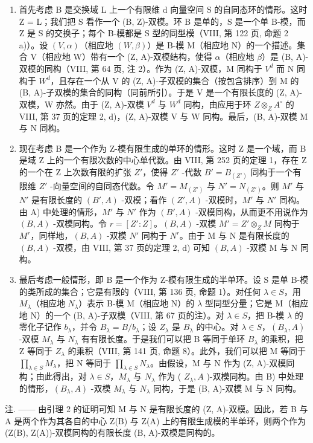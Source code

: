 \begin{enumerate}
\def\labelenumi{\Alph{enumi})}
\item
  首先考虑 B 是交换域 L 上一个有限维 d 向量空间 S 的自同态环的情形。这时 Z = L；我们把 S 看作一个 (B, Z)-双模。环 B 是单的，S 是一个单 B-模，而 Z 是 S 的交换子；每个 B-模都是 S 型的同型模（VIII, 第 122 页, 命题 2 a)）。设 \((V, \alpha)\)（相应地 \((W, \beta)\)）是 B-模 M（相应地 N）的一个描述。集合 V（相应地 W）带有一个 (Z, A)-双模结构，使得 \(\alpha\)（相应地 \(\beta\)）是 (B, A)-双模的同构（VIII, 第 64 页, 注 2）。作为 (Z, A)-双模，M 同构于 \(V^{d}\) 而 N 同构于 \(W^{d}\)，且存在一个从 V 的 (Z, A)-子双模的集合（按包含排序）到 M 的 (B, A)-子双模的集合的同构（同前所引）。于是 V 是一个有限长度的 (Z, A)-双模，W 亦然。由于 (Z, A)-双模 \(V^{d}\) 与 \(W^{d}\) 同构，由应用于环 \(Z \otimes_{Z} A^{\circ}\) 的 VIII, 第 37 页的定理 2, d)，(Z, A)-双模 V 与 W 同构。最后，(B, A)-双模 M 与 N 同构。
\item
  现在考虑 B 是一个作为 Z-模有限生成的单环的情形。这时 Z 是一个域，而 B 是域 Z 上的一个有限次数的中心单代数。由 VIII, 第 252 页的定理 1，存在 Z 的一个在 Z 上次数有限的扩张 \(Z'\)，使得 \(Z'\) -代数 \(B' = B_{(Z')}\) 同构于一个有限维 \(Z'\) -向量空间的自同态代数。令 \(M' = M_{(Z')}\) 与 \(N' = N_{(Z')}\)。则 \(M'\) 与 \(N'\) 是有限长度的 \((B', A)\) -双模；看作 \((Z', A)\) -双模时，\(M'\) 与 \(N'\) 同构。由 A) 中处理的情形，\(M'\) 与 \(N'\) 作为 \((B', A)\) -双模同构，从而更不用说作为 \((B, A)\) -双模同构。令 \(r = [Z' : Z]\)。\((B, A)\) -双模 \(M' = Z' \otimes_{Z} M\) 同构于 \(M^r\)，同样地，\((B, A)\) -双模 \(N'\) 同构于 \(N^r\)。由于 M 与 N 是有限长度的 \((B, A)\) -双模，由 VIII, 第 37 页的定理 2, d) 可知 \((B, A)\) -双模 M 与 N 同构。
\item
  最后考虑一般情形，即 B 是一个作为 Z-模有限生成的半单环。设 S 是单 B-模的类所成的集合；它是有限的（VIII, 第 136 页, 命题 1）。对任何 \(\lambda \in S\)，用 \(M_{\lambda}\)（相应地 \(N_{\lambda}\)）表示 B-模 M（相应地 N）的 \(\lambda\) 型同型分量；它是 M（相应地 N）的一个 (B, A)-子双模（VIII, 第 67 页的注）。对 \(\lambda \in S\)，把 B-模 \(\lambda\) 的零化子记作 \(b_{\lambda}\)，并令 \(B_{\lambda} = B / b_{\lambda}\)；设 \(Z_{\lambda}\) 是 \(B_{\lambda}\) 的中心。对 \(\lambda \in S\)，\((B_{\lambda}, A)\) -双模 \(M_{\lambda}\) 与 \(N_{\lambda}\) 有有限长度。于是我们可以把 B 等同于单环 \(B_{\lambda}\) 的乘积，把 Z 等同于 \(Z_{\lambda}\) 的乘积（VIII, 第 141 页, 命题 8）。此外，我们可以把 M 等同于 \(\prod_{\lambda \in S} M_{\lambda}\)，把 N 等同于 \(\prod_{\lambda \in S} N_{\lambda}\)。由假设，M 与 N 作为 (Z, A)-双模同构；由此得出，对 \(\lambda \in S\)，\(M_{\lambda}\) 与 \(N_{\lambda}\) 作为 ( \(Z_{\lambda}, A\) )-双模同构。由 B) 中处理的情形，\((B_{\lambda}, A)\) -双模 \(M_{\lambda}\) 与 \(N_{\lambda}\) 同构，于是 (B, A)-双模 M 与 N 同构。
\end{enumerate}

注. —— 由引理 2 的证明可知 M 与 N 是有限长度的 (Z, A)-双模。因此，若 B 与 A 是两个作为其各自的中心 Z(B) 与 Z(A) 上的有限生成模的半单环，则两个作为 (Z(B), Z(A))-双模同构的有限长度 (B, A)-双模是同构的。
\relax{}
